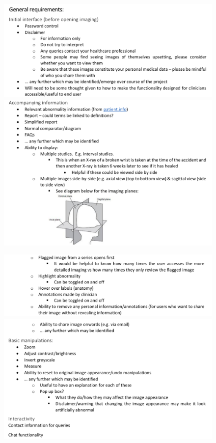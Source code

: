 \begin{figure}[ht]
\centering
\includegraphics[width = 0.95\hsize]{./figures/GeneralSpec1}
\includegraphics[width = 0.95\hsize]{./figures/GeneralSpec2}
\end{figure}



\clearpage

\begin{figure}[ht]
\centering
\includegraphics[width = 0.95\hsize]{./figures/GeneralSpec3}
\includegraphics[width = 0.95\hsize]{./figures/GeneralSpec4}
\end{figure}